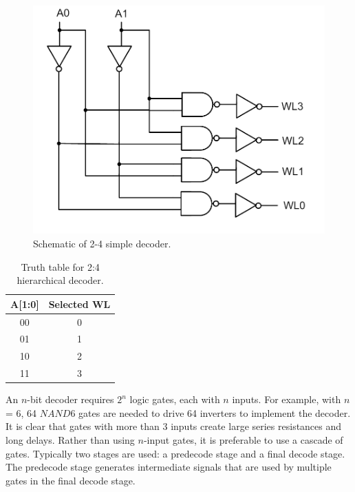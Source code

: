 \begin{figure}[h!]
\centering
\includegraphics[scale=.6]{./figs/2t4decoder.pdf}
\caption{Schematic of 2-4 simple decoder.}
\label{fig:2 to 4 decoder}
\end{figure}

 \begin{table}[h!] 
   \begin{center}
     \begin{tabular}{| c | c |}
     \hline
     A[1:0] & Selected WL\\ \hline
     00 & 0\\ \hline
     01 & 1\\ \hline
     10 & 2\\ \hline
     11 & 3\\ \hline

     \end{tabular}
   \end{center}
   \caption{Truth table for 2:4 hierarchical decoder.}
   \label{table:2-4 hierarchical_decoder}
 \end{table}


An $n$-bit decoder requires {$2^n$} logic gates, each with $n$ inputs. For example, with $n$ = 6, 
64 $NAND6$ gates are needed to drive 64 inverters to implement the decoder.
It is clear that gates with more than 3 inputs create large series resistances and long delays. 
Rather than using $n$-input gates, it is preferable to use a cascade of gates. 
Typically two stages are used: a predecode stage and a final decode stage. 
The predecode stage generates intermediate signals that are used 
by multiple gates in the final decode stage.



